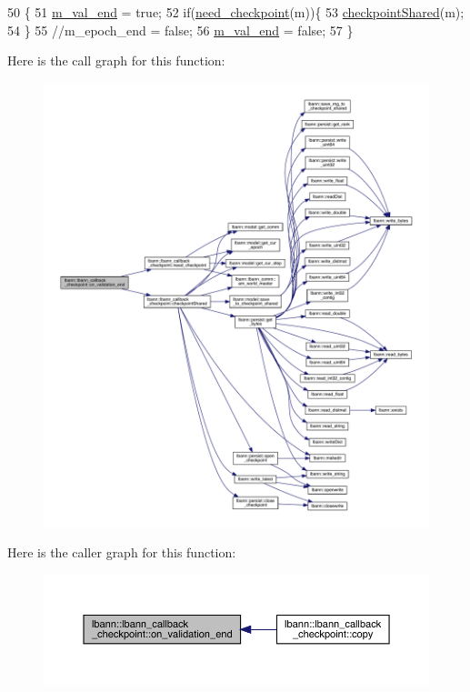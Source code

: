 \begin{DoxyCode}
50                                                           \{
51   \hyperlink{classlbann_1_1lbann__callback__checkpoint_a3827e5bb569f80d790c3ac856a7c39b5}{m\_val\_end} = \textcolor{keyword}{true};
52   \textcolor{keywordflow}{if}(\hyperlink{classlbann_1_1lbann__callback__checkpoint_a2e5f396667ccc45f7203263b06c5e216}{need\_checkpoint}(m))\{
53     \hyperlink{classlbann_1_1lbann__callback__checkpoint_a23b6f5abb924b2c4d0694e98c7d6f4d5}{checkpointShared}(m);
54   \}
55   \textcolor{comment}{//m\_epoch\_end = false;}
56   \hyperlink{classlbann_1_1lbann__callback__checkpoint_a3827e5bb569f80d790c3ac856a7c39b5}{m\_val\_end} = \textcolor{keyword}{false};
57 \}
\end{DoxyCode}
Here is the call graph for this function\+:\nopagebreak
\begin{figure}[H]
\begin{center}
\leavevmode
\includegraphics[width=350pt]{classlbann_1_1lbann__callback__checkpoint_a5fb4288c03b1ce14681b72562e9471b2_cgraph}
\end{center}
\end{figure}
Here is the caller graph for this function\+:\nopagebreak
\begin{figure}[H]
\begin{center}
\leavevmode
\includegraphics[width=350pt]{classlbann_1_1lbann__callback__checkpoint_a5fb4288c03b1ce14681b72562e9471b2_icgraph}
\end{center}
\end{figure}
